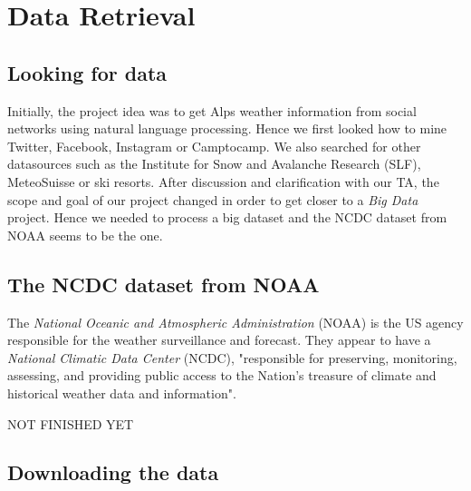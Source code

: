 \section{Data Retrieval}
\subsection{Looking for data}
Initially, the project idea was to get Alps weather information from social networks using natural language processing. Hence we first looked how to mine Twitter, Facebook, Instagram or Camptocamp. We also searched for other datasources such as the Institute for Snow and Avalanche Research (SLF), MeteoSuisse or ski resorts. After discussion and clarification with our TA, the scope and goal of our project changed in order to get closer to a \emph{Big Data} project. Hence we needed to process a big dataset and the NCDC dataset from NOAA seems to be the one.

\subsection{The NCDC dataset from NOAA}
The \emph{National Oceanic and Atmospheric Administration} (NOAA) is the US agency responsible for the weather surveillance and forecast. They appear to have a \emph{National Climatic Data Center} (NCDC), "responsible for preserving, monitoring, assessing, and providing public access to the Nation's treasure of climate and historical weather data and information".

NOT FINISHED YET

\subsection{Downloading the data}